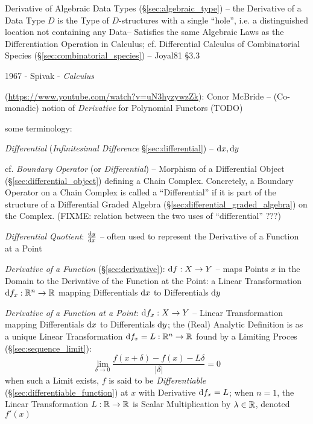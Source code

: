 \fist Derivative of Algebraic Data Types (\S\ref{sec:algebraic_type}) -- the
Derivative of a Data Type $D$ is the Type of $D$-structures with a single
``hole'', i.e. a distinguished location not containing any Data-- Satisfies the
same Algebraic Laws as the Differentiation Operation in Calculus;
cf. Differential Calculus of Combinatorial Species
(\S\ref{sec:combinatorial_species}) -- Joyal81 \S3.3

1967 - Spivak - \emph{Calculus}

(\url{https://www.youtube.com/watch?v=uN3hyzywzZk}): Conor McBride --
(Co-monadic) notion of \emph{Derivative} for Polynomial Functors (TODO)

some terminology:

\emph{Differential} (\emph{Infinitesimal Difference} \S\ref{sec:differential})
-- $\mathrm{d}x, \mathrm{d}y$

\fist cf. \emph{Boundary Operator} (or \emph{Differential}) -- Morphism of a
Differential Object (\S\ref{sec:differential_object}) defining a Chain Complex.
Concretely, a Boundary Operator on a Chain Complex is called a ``Differential''
if it is part of the structure of a Differential Graded Algebra
(\S\ref{sec:differential_graded_algebra}) on the Complex.
(FIXME: relation between the two uses of ``differential'' ???)

\emph{Differential Quotient}: $\frac{\mathrm{d}y}{\mathrm{d}x}$ -- often used to represent the
Derivative of a Function at a Point

\emph{Derivative of a Function} (\S\ref{sec:derivative}): $\mathrm{d}f : X
\rightarrow Y$ -- maps Points $x$ in the Domain to the Derivative of the
Function at the Point: a Linear Transformation
$\mathrm{d}f_x : \mathbb{R}^n \rightarrow \mathbb{R}$ mapping Differentials $\mathrm{d}x$ to
Differentials $\mathrm{d}y$

\emph{Derivative of a Function at a Point}: $\mathrm{d}f_x : X \rightarrow Y$ --
Linear Transformation mapping Differentials $\mathrm{d}x$ to Differentials
$\mathrm{d}y$; the (Real) Analytic Definition is as a unique Linear Transformation
$\mathrm{d}f_x = L : \mathbb{R}^n \rightarrow \mathbb{R}$ found by a Limiting Proces
(\S\ref{sec:sequence_limit}):
\[
  \lim_{\delta\rightarrow0} \frac{f(x + \delta) - f(x) - L\delta}{|\delta|} = 0
\]
when such a Limit exists, $f$ is said to be \emph{Differentiable}
(\S\ref{sec:differentiable_function}) at $x$ with Derivative $\mathrm{d}f_x = L$;
when $n=1$, the Linear Transformation $L : \mathbb{R} \rightarrow \mathbb{R}$ is Scalar
Multiplication by $\lambda \in \mathbb{R}$, denoted $f'(x)$

